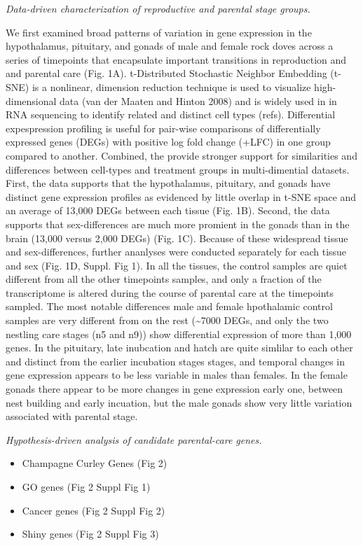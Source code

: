 \emph{Data-driven characterization of reproductive and parental stage
groups.}

We first examined broad patterns of variation in gene expression in the
hypothalamus, pituitary, and gonads of male and female rock doves across
a series of timepoints that encapsulate important transitions in
reproduction and and parental care (Fig. 1A). t-Distributed Stochastic
Neighbor Embedding (t-SNE) is a nonlinear, dimension reduction technique
is used to visualize high-dimensional data (van der Maaten and Hinton
2008) and is widely used in in RNA sequencing to identify related and
distinct cell types (refs). Differential expespression profiling is
useful for pair-wise comparisons of differentially expressed genes
(DEGs) with positive log fold change (+LFC) in one group compared to
another. Combined, the provide stronger support for similarities and
differences between cell-types and treatment groups in multi-dimential
datasets. First, the data supports that the hypothalamus, pituitary, and
gonads have distinct gene expression profiles as evidenced by little
overlap in t-SNE space and an average of 13,000 DEGs between each tissue
(Fig. 1B). Second, the data supports that sex-differences are much more
promient in the gonads than in the brain (13,000 versus 2,000 DEGs)
(Fig. 1C). Because of these widespread tissue and sex-differences,
further ananlyses were conducted separately for each tissue and sex
(Fig. 1D, Suppl. Fig 1). In all the tissues, the control samples are
quiet different from all the other timepoints samples, and only a
fraction of the transcriptome is altered during the course of parental
care at the timepoints sampled. The most notable differences male and
female hpothalamic control samples are very different from on the rest
(\textasciitilde{}7000 DEGs, and only the two nestling care stages (n5
and n9)) show differential expression of more than 1,000 genes. In the
pituitary, late inubcation and hatch are quite simlilar to each other
and distinct from the earlier incubation stages stages, and temporal
changes in gene expression appears to be less variable in males than
females. In the female gonads there appear to be more changes in gene
expression early one, between nest building and early incuation, but the
male gonads show very little variation associated with parental stage.

\emph{Hypothesis-driven analysis of candidate parental-care genes.}

\begin{itemize}
\tightlist
\item
  Champagne Curley Genes (Fig 2)
\item
  GO genes (Fig 2 Suppl Fig 1)
\item
  Cancer genes (Fig 2 Suppl Fig 2)
\item
  Shiny genes (Fig 2 Suppl Fig 3)
\end{itemize}

